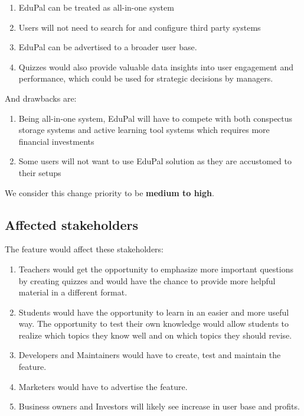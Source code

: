 \documentclass[
    english, %
]{VUMIFPSkursinis}
\begin{document}
\begin{enumerate}
    \item EduPal can be treated as all-in-one system
    \item Users will not need to search for and configure third party systems
    \item EduPal can be advertised to a broader user base.
    \item Quizzes would also provide valuable data insights into user engagement and performance, which could be used for strategic decisions by managers.
\end{enumerate}

And drawbacks are:

\begin{enumerate}
    \item Being all-in-one system, EduPal will have to compete with both conspectus storage systems and active learning tool systems which requires more financial investments
    \item Some users will not want to use EduPal solution as they are accustomed to their setups
\end{enumerate}

We consider this change priority to be \textbf{medium to high}.

\subsection{Affected stakeholders}

The feature would affect these stakeholders:

\begin{enumerate}
    \item Teachers would get the opportunity to emphasize more important questions by creating quizzes and would have the chance to provide more helpful material in a different format.
    \item Students would have the opportunity to learn in an easier and more useful way. The opportunity to test their own knowledge would allow students to realize which topics they know well and on which topics they should revise.
    \item Developers and Maintainers would have to create, test and maintain the feature.
    \item Marketers would have to advertise the feature.
    \item Business owners and Investors will likely see increase in user base and profits.
\end{enumerate}
\end{document}
